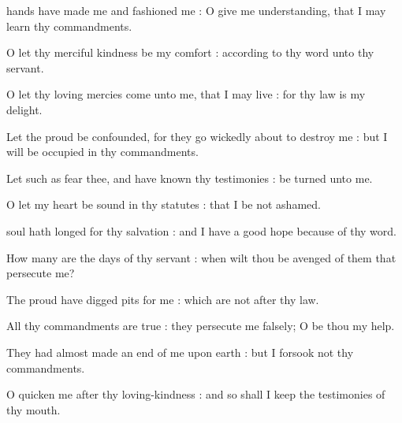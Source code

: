
 hands have made me and fashioned me : O give me understanding, that I may learn thy commandments.\par
{}
O let thy merciful kindness be my comfort : according to thy word unto thy servant.\par
{}O let thy loving mercies come unto me, that I may live : for thy law is my delight.\par
{}Let the proud be confounded, for they go wickedly about to destroy me : but I will be occupied in thy commandments.\par
{}Let such as fear thee, and have known thy testimonies : be turned unto me.\par
{}O let my heart be sound in thy statutes : that I be not ashamed.\par

 soul hath longed for thy salvation : and I have a good hope because of thy word.\par
{}
How many are the days of thy servant : when wilt thou be avenged of them that persecute me?\par
{}The proud have digged pits for me : which are not after thy law.\par
{}All thy commandments are true : they persecute me falsely; O be thou my help.\par
{}They had almost made an end of me upon earth : but I forsook not thy commandments.\par
{}O quicken me after thy loving-kindness : and so shall I keep the testimonies of thy mouth.\par

